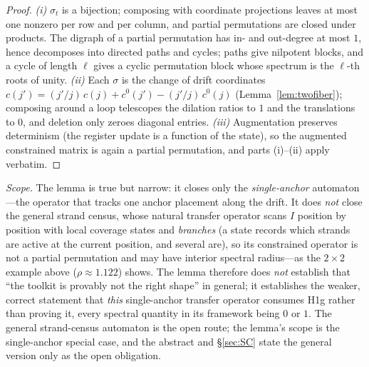 \documentclass[11pt,a4paper]{article}
\numberwithin{equation}{section}
\theoremstyle{plain}
\theoremstyle{definition}
\theoremstyle{remark}
\begin{document}
\begin{proof}
\emph{(i)} $\sigma_t$ is a bijection; composing with coordinate
projections leaves at most one nonzero per row and per column, and
partial permutations are closed under products. The digraph of a
partial permutation has in- and out-degree at most $1$, hence
decomposes into directed paths and cycles; paths give nilpotent
blocks, and a cycle of length $\ell$ gives a cyclic permutation block
whose spectrum is the $\ell$-th roots of unity.
\emph{(ii)} Each $\sigma$ is the change of drift coordinates
$c(j')=(j'/j)\,c(j)+c^0(j')-(j'/j)\,c^0(j)$
(Lemma~\ref{lem:twofiber}); composing around a loop telescopes the
dilation ratios to $1$ and the translations to $0$, and deletion only
zeroes diagonal entries. \emph{(iii)} Augmentation preserves
determinism (the register update is a function of the state), so the
augmented constrained matrix is again a partial permutation, and
parts (i)--(ii) apply verbatim.
\end{proof}

\emph{Scope.} The lemma is
true but narrow: it closes only the \emph{single-anchor} automaton---the
operator that tracks one anchor placement along the drift. It does
\emph{not} close the general strand census, whose natural transfer
operator scans $I$ position by position with local coverage states and
\emph{branches} (a state records which strands are active at the current
position, and several are), so its constrained operator is not a partial
permutation and may have interior spectral radius---as the $2\times2$
example above ($\rho\approx1.122$) shows. The lemma therefore does
\emph{not} establish that ``the toolkit is provably not the right
shape'' in general; it establishes the weaker, correct statement that
\emph{this} single-anchor transfer operator consumes H1g rather than
proving it, every spectral quantity in its framework being $0$ or $1$.
The general strand-census automaton is the open route; the lemma's
scope is the single-anchor special case, and the abstract and
\S\ref{sec:SC} state the general version only as the open obligation.
\end{document}
